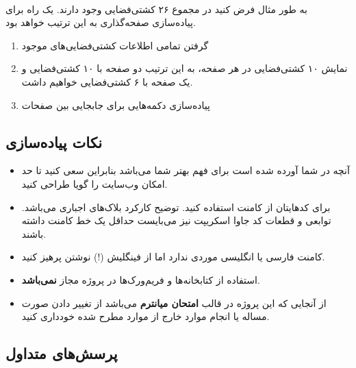 \documentclass[../main.tex]{subfiles}
\begin{document}
\paragraph{}
به طور مثال فرض کنید در مجموع ۲۶ کشتی‌فضایی وجود دارند. یک راه برای پیاده‌سازی صفحه‌گذاری به این ترتیب خواهد بود.

\begin{enumerate}
  \item گرفتن تمامی اطلاعات کشتی‌فضایی‌های موجود
  \item نمایش ۱۰ کشتی‌فضایی در هر صفحه، به این ترتیب دو صفحه با ۱۰ کشتی‌فضایی و یک صفحه با ۶ کشتی‌فضایی خواهیم داشت.
  \item پیاده‌سازی دکمه‌هایی برای جابجایی بین صفحات
\end{enumerate}

\subsection{نکات پیاده‌سازی}

\begin{itemize}
    \item آنچه در شما آورده شده است برای فهم بهتر شما می‌باشد بنابراین سعی کنید تا حد امکان وب‌سایت را گویا طراحی کنید.
    \item برای کدهایتان از کامنت استفاده کنید. توضیح کارکرد بلاک‌های  اجباری می‌باشد. توابعی و قطعات کد جاوا اسکریپت نیز می‌بایست حداقل یک خط کامنت داشته باشند.
    \item کامنت فارسی یا انگلیسی موردی ندارد اما از فینگلیش (!) نوشتن پرهیز کنید.
    \item استفاده از کتابخانه‌ها و فریم‌ورک‌ها در پروژه مجاز \textbf{نمی‌باشد}.
    \item از آنجایی که این پروژه در قالب \textbf{امتحان میانترم} می‌باشد از تغییر دادن صورت مساله یا انجام موارد خارج از موارد مطرح شده خودداری کنید.
\end{itemize}

\subsection{پرسش‌های متداول}
\end{document}
